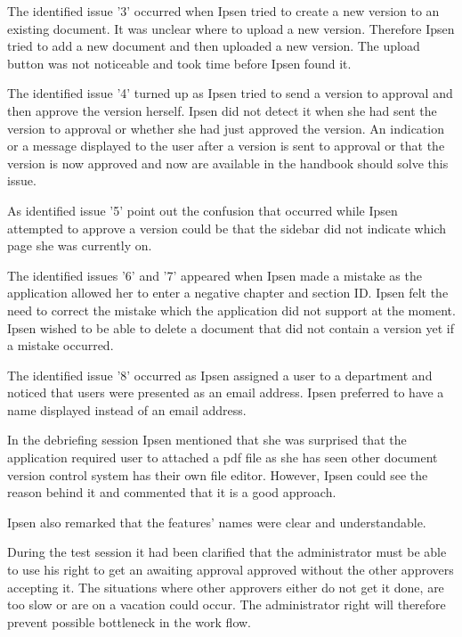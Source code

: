 The identified issue '3' occurred when Ipsen tried to create a new version to an existing document.
It was unclear where to upload a new version.
Therefore Ipsen tried to add a new document and then uploaded a new version.
The upload button was not noticeable and took time before Ipsen found it.

The identified issue '4' turned up as Ipsen tried to send a version to approval and then  approve the version herself.
Ipsen did not detect it when she had sent the version to approval or whether she had just approved the version.
An indication or a message displayed to the user after a version is sent to approval or that the version is now approved and now are available in the handbook should solve this issue. 

As identified issue '5' point out the confusion that occurred while Ipsen attempted to approve a version could be that the sidebar did not indicate which page she was currently on.

The identified issues '6' and '7' appeared when Ipsen made a mistake as the application allowed her to enter a negative chapter and section ID.
Ipsen felt the need to correct the mistake which the application did not support at the moment.
Ipsen wished to be able to delete a document that did not contain a version yet if a mistake occurred.

The identified issue '8' occurred as Ipsen assigned a user to a department and noticed that users were presented as an email address.
Ipsen preferred to have a name displayed instead of an email address.

In the debriefing session Ipsen mentioned that she was surprised that the application required user to attached a pdf file as she has seen other document version control system has their own file editor.
However, Ipsen could see the reason behind it and commented that it is a good approach.

Ipsen also remarked that the features' names were clear and understandable.

During the test session it had been clarified that the administrator must be able to use his right to get an awaiting approval approved without the other approvers accepting it.
The situations where other approvers either do not get it done, are too slow or are on a vacation could occur.
The administrator right will therefore prevent possible bottleneck in the work flow.

